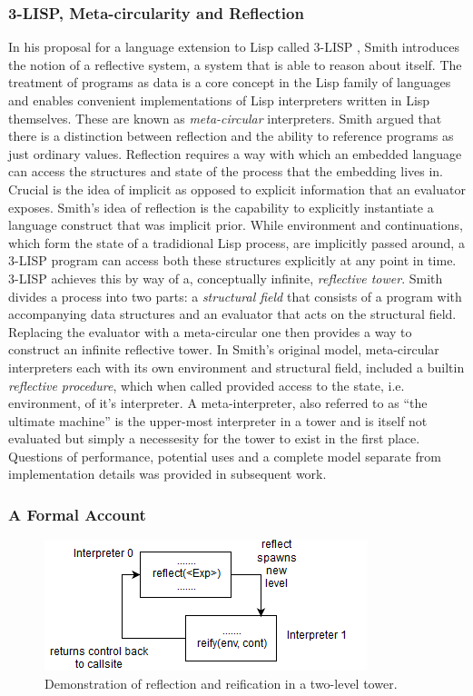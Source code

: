 \documentclass[fleqn]{article}
\theoremstyle{definition}
\begin{document}
\subsubsection{3-LISP, Meta-circularity and Reflection}
In his proposal for a language extension to Lisp called 3-LISP \cite{smith1984reflection}, Smith introduces the notion of a reflective system, a system that is able to reason about itself. The treatment of programs as data is a core concept in the Lisp family of languages and enables  convenient implementations of Lisp interpreters written in Lisp themselves. These are known as \textit{meta-circular} interpreters. Smith argued that there is a distinction between reflection and the ability to reference programs as just ordinary values. Reflection requires a way with which an embedded language can access the structures and state of the process that the embedding lives in. Crucial is the idea of implicit as opposed to explicit information that an evaluator exposes. Smith's idea of reflection is the capability to explicitly instantiate a language construct that was implicit prior. While environment and continuations, which form the state of a tradidional Lisp process, are implicitly passed around, a 3-LISP program can access both these structures explicitly at any point in time. 3-LISP achieves this by way of a, conceptually infinite, \textit{reflective tower}. Smith divides a process into two parts: a \textit{structural field} that consists of a program with accompanying data structures and an evaluator that acts on the structural field. Replacing the evaluator with a meta-circular one then provides a way to construct an infinite reflective tower. In Smith's original model, meta-circular interpreters each with its own environment and structural field, included a builtin \textit{reflective procedure}, which when called provided access to the state, i.e. environment, of it's interpreter. A meta-interpreter, also referred to as ``the ultimate machine'' is the upper-most interpreter in a tower and is itself not evaluated but simply a necessesity for the tower to exist in the first place. Questions of performance, potential uses and a complete model separate from implementation details was provided in subsequent work.
\subsubsection{A Formal Account}
\begin{figure}[t]
	\centering
	\includegraphics{refl_reif_tower.png}
	\caption{Demonstration of reflection and reification in a two-level tower.}\label{refl_reif_tower}
\end{figure}
\end{document}
